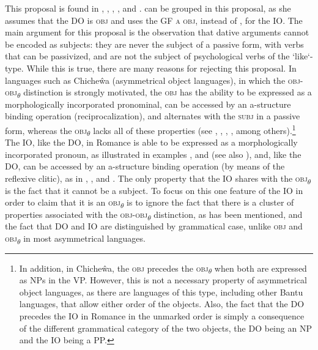\documentclass[output=paper,hidelinks]{langscibook}
\begin{document}
  This proposal is found in \citet[115--118]{falk2001lexical}, \citet{AlencarKelling2005}, \citet{Aranovich2012}, \citet{Quaglia2012}, and \citet{CarreteroGarcia2018}. \citet{Grimshaw1982} can be grouped in this proposal, as she assumes that the DO is \textsc{obj} and uses the GF \textsc{a} \textsc{obj}, instead of \OBJTHETA, for the IO. The main argument for this proposal is the observation that dative arguments cannot be encoded as subjects: they are never the subject of a passive form, with verbs that can be passivized, and are not the subject of psychological verbs of the `like`-type. While this is true, there are many reasons for rejecting this proposal. In languages such as Chiche\^wa (asymmetrical object languages), in which the \textsc{obj}{}-\textsc{obj}\textsubscript{$\theta$} distinction is strongly motivated, the \textsc{obj} has the ability to be expressed as a morphologically incorporated pronominal, can be accessed by an a-structure binding operation (reciprocalization), and alternates with the \textsc{subj} in a passive form, whereas the \textsc{obj}\textsubscript{$\theta$} lacks all of these properties (see \citealt{Baker1988,Baker:Theta}, \citealt{AlsinaMchombo1990}, \citealt{BresMosh90}, \citealt{Alsina:Passive}, among others).\footnote{In addition, in Chiche\^wa, the \textsc{obj} precedes the \textsc{obj}\textsubscript{$\theta$} when both are expressed as NPs in the VP. However, this is not a necessary property of asymmetrical object languages, as there are languages of this type, including other Bantu languages, that allow either order of the objects. Also, the fact that the DO precedes the IO in Romance in the unmarked order is simply a consequence of the different grammatical category of the two objects, the DO being an NP and the IO being a PP.} The IO, like the DO, in Romance is able to be expressed as a morphologically incorporated pronoun, as illustrated in examples ,  and  (see also ), and, like the DO, can be accessed by an a-structure binding operation (by means of the reflexive clitic), as in , , and . The only property that the IO shares with the \textsc{obj}\textsubscript{$\theta$} is the fact that it cannot be a subject. To focus on this one feature of the IO in order to claim that it is an \textsc{obj}\textsubscript{$\theta$} is to ignore the fact that there is a cluster of properties associated with the \textsc{obj}{}-\textsc{obj}\textsubscript{$\theta$} distinction, as has been mentioned, and the fact that DO and IO are distinguished by grammatical case, unlike \textsc{obj} and \textsc{obj}\textsubscript{$\theta$} in most asymmetrical languages. 
\end{document}

